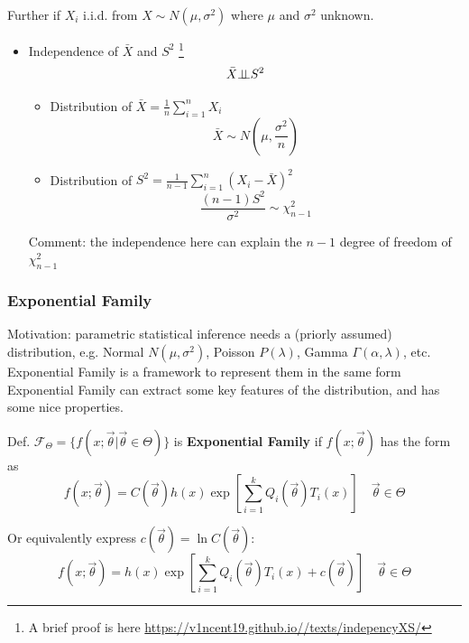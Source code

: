     Further if $X_i$ i.i.d. from $X\sim N(\mu,\sigma^2)$ where $\mu$ and $\sigma^2$ unknown.
    \begin{itemize}
        \item Independence of $\bar{X}$ and $S^2$ \footnote{A brief proof is here \url{https://v1ncent19.github.io//texts/indepencyXS/}}
            \begin{equation}
            \bar{X}\bot\!\!\!\bot S^2
            \end{equation}
        \begin{itemize}[topsep=6pt,itemsep=4pt]
        \item Distribution of $\bar{X}={\displaystyle\frac{1}{n}\sum_{i=1}^n X_i}$
        \begin{equation}\bar{X}\sim N(\mu,\frac{\sigma^2}{n})\end{equation}
        \item Distribution of $S^2={\displaystyle\frac{1}{n-1}\sum_{i=1}^n(X_i-\bar{X})^2}$
        \begin{equation}\frac{(n-1)S^2}{\sigma^2}\sim\chi^2_{n-1}\end{equation}
        \end{itemize}     
        Comment: the independence here can explain the $ n-1 $ degree of freedom of $ \chi^2_{n-1} $   
    \end{itemize}

\subsubsection{Exponential Family}\label{SubSectionExponentialFamily}

Motivation: parametric statistical inference needs a (priorly assumed) distribution, e.g. Normal $ N(\mu ,\sigma ^2) $, Poisson $ P(\lambda ) $, Gamma $ \Gamma (\alpha ,\lambda ) $, etc. Exponential Family is a framework to represent them in the same form Exponential Family can extract some key features of the distribution, and has some nice properties.

Def. $\mathscr{F}_\Theta=\{f(x;\vec{\theta}|\vec{\theta}\in\Theta)\}$ is \textbf{Exponential Family} if $f(x;\vec{\theta})$ has the form as
\begin{equation}
    f(x;\vec{\theta})=C(\vec{\theta})h(x)\exp \left[  \sum_{i=1}^k Q_i(\vec{\theta})T_i(x) \right]\quad\vec{\theta}\in\Theta
\end{equation}    

    Or equivalently express $ c(\vec{\theta })=\ln C(\vec{\theta }) $:
\begin{equation}
    f(x;\vec{\theta})=h(x)\exp \left[  \sum_{i=1}^k Q_i(\vec{\theta})T_i(x) +c(\vec{\theta }) \right]\quad\vec{\theta}\in\Theta
\end{equation}   

